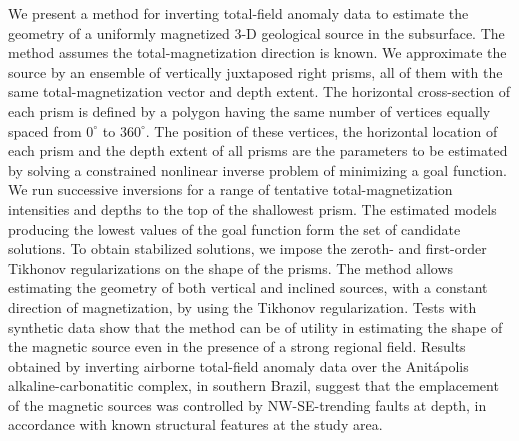\begin{summary}
We present a method for inverting total-field anomaly data to estimate the geometry of 
a uniformly magnetized 3-D geological source in the subsurface. The method assumes 
the total-magnetization direction is known. We approximate the source by an 
ensemble of vertically juxtaposed right prisms, all of them with the same 
total-magnetization vector and depth extent. The horizontal cross-section 
of each prism is defined by a polygon having the same number of vertices 
equally spaced from $0^{\circ}$ to $360^{\circ}$. The position of these 
vertices, the horizontal location of each prism and the depth extent of all prisms 
are the parameters to be estimated by solving a constrained nonlinear inverse problem 
of minimizing a goal function. 
We run successive inversions for a range of tentative total-magnetization intensities 
and depths to the top of the shallowest prism. The estimated models producing 
the lowest values of the goal function form the set of candidate solutions.
To obtain stabilized solutions, we impose the zeroth- and first-order Tikhonov 
regularizations on the shape of the prisms. The method allows estimating the geometry 
of both vertical and inclined sources, with a constant direction of magnetization, 
by using the Tikhonov regularization. 
Tests with synthetic data show that the method can be of utility in estimating the shape of the magnetic source even in the presence of a strong regional field.
Results obtained by inverting airborne total-field anomaly data over the 
Anit{\'a}polis alkaline-carbonatitic complex, in southern Brazil, 
suggest that the emplacement of the magnetic sources was controlled by NW-SE-trending 
faults at depth, in accordance with known structural features at the study area.
\end{summary}